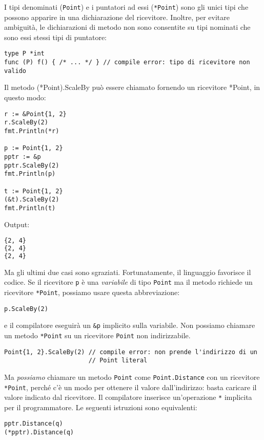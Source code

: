 \documentclass[../../thesis.tex]{subfiles}
\begin{document}
    I tipi denominati (\verb"Point") e i puntatori ad essi (\verb"*Point") sono gli unici tipi che possono apparire in una dichiarazione del ricevitore.
    Inoltre, per evitare ambiguità, le dichiarazioni di metodo non sono consentite su tipi nominati che sono essi stessi tipi di puntatore:
    \begin{lstlisting}[frame = single, label = {lst:lstlisting5-2.2}]
type P *int
func (P) f() { /* ... */ } // compile error: tipo di ricevitore non valido
    \end{lstlisting}
    Il metodo (*Point).ScaleBy può essere chiamato fornendo un ricevitore *Point, in questo modo:
    \begin{lstlisting}[frame = single, label = {lst:lstlisting5-2.3}]
r := &Point{1, 2}
r.ScaleBy(2)
fmt.Println(*r)

p := Point{1, 2}
pptr := &p
pptr.ScaleBy(2)
fmt.Println(p)

t := Point{1, 2}
(&t).ScaleBy(2)
fmt.Println(t)
    \end{lstlisting}
    Output:
    \begin{lstlisting}[language = bash, frame = L, label = {lst:lstlisting5-2.4}]
{2, 4}
{2, 4}
{2, 4}
    \end{lstlisting}
    Ma gli ultimi due casi sono sgraziati.
    Fortunatamente, il linguaggio favorisce il codice.
    Se il ricevitore \verb"p" è una \textit{variabile} di tipo \verb"Point" ma il metodo richiede un ricevitore \verb"*Point", possiamo usare questa abbreviazione:
    \begin{lstlisting}[frame = single, label = {lst:lstlisting5-2.5}]
p.ScaleBy(2)
    \end{lstlisting}
    e il compilatore eseguirà un \verb"&p" implicito sulla variabile.
    Non possiamo chiamare un metodo \verb"*Point" su un ricevitore \verb"Point" non indirizzabile.
    \begin{lstlisting}[frame = single, label = {lst:lstlisting5-2.6}]
Point{1, 2}.ScaleBy(2) // compile error: non prende l'indirizzo di un
                       // Point literal
    \end{lstlisting}
    Ma \textit{possiamo} chiamare un metodo \verb"Point" come \verb"Point.Distance" con un ricevitore \verb"*Point", perché c'è un modo per ottenere il valore dall'indirizzo: basta caricare il valore indicato dal ricevitore.
    Il compilatore inserisce un'operazione \verb"*" implicita per il programmatore.
    Le seguenti istruzioni sono equivalenti:
    \begin{lstlisting}[frame = single, label = {lst:lstlisting5-2.7}]
pptr.Distance(q)
(*pptr).Distance(q)
    \end{lstlisting}
    \clearpage
    \newpage
\end{document}
